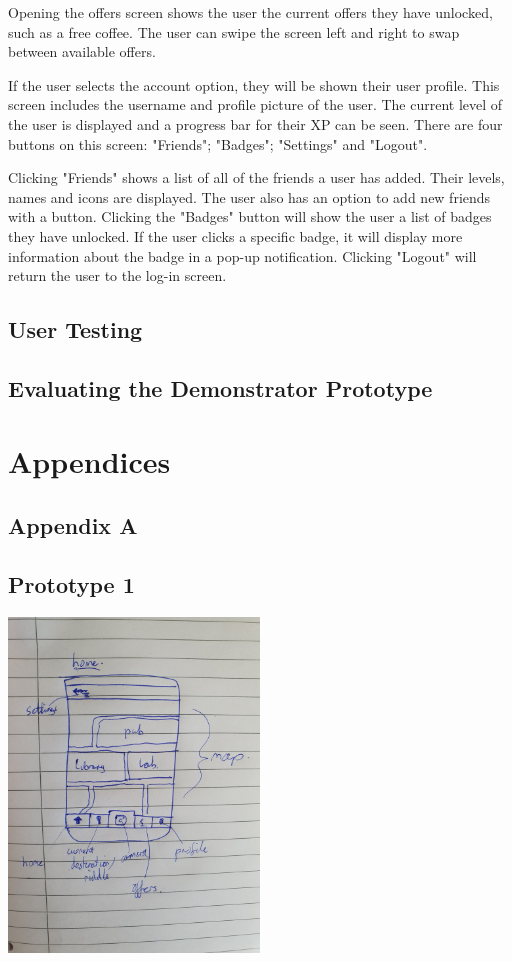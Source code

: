 \documentclass[10pt,twocolumn]{article} %
\begin{document}
Opening the offers screen shows the user the current offers they have unlocked, such as a free coffee. The user can swipe the screen left and right to swap between available offers.

If the user selects the account option, they will be shown their user profile. This screen includes the username and profile picture of the user. The current level of the user is displayed and a progress bar for their XP can be seen. There are four buttons on this screen: "Friends"; "Badges"; "Settings" and "Logout".

Clicking "Friends" shows a list of all of the friends a user has added. Their levels, names and icons are displayed. The user also has an option to add new friends with a button. Clicking the "Badges" button will show the user a list of badges they have unlocked. If the user clicks a specific badge, it will display more information about the badge in a pop-up notification. Clicking "Logout" will return the user to the log-in screen.

\subsection*{User Testing}

\subsection*{Evaluating the Demonstrator Prototype}

\onecolumn
\section*{Appendices}
\subsection*{Appendix A}
\subsection*{Prototype 1}
\includegraphics[width=0.5\textwidth]{./figures/bens_initial_proto/1.jpg}
\end{document}
